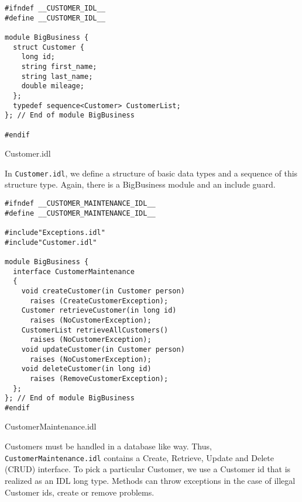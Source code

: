 \newpage
 
\begin{Example}
\begin{minifbox}
\begin{small}
\begin{verbatim}
#ifndef __CUSTOMER_IDL__
#define __CUSTOMER_IDL__

module BigBusiness {
  struct Customer {
    long id;
    string first_name;
    string last_name;
    double mileage;
  };
  typedef sequence<Customer> CustomerList;
}; // End of module BigBusiness

#endif
\end{verbatim}
\end{small}
\end{minifbox}
\caption{Customer.idl}
\label{example:Customer}
\end{Example}

In {\tt Customer.idl}, we define a structure of basic 
data types and a sequence of this structure type.
Again, there is a BigBusiness module and an include guard.

\begin{Example}
\begin{minifbox}
\begin{small}
\begin{verbatim}
#ifndef __CUSTOMER_MAINTENANCE_IDL__
#define __CUSTOMER_MAINTENANCE_IDL__

#include"Exceptions.idl"
#include"Customer.idl"

module BigBusiness {
  interface CustomerMaintenance
  {
    void createCustomer(in Customer person) 
      raises (CreateCustomerException);
    Customer retrieveCustomer(in long id)  
      raises (NoCustomerException);
    CustomerList retrieveAllCustomers()  
      raises (NoCustomerException);
    void updateCustomer(in Customer person)  
      raises (NoCustomerException);
    void deleteCustomer(in long id)  
      raises (RemoveCustomerException);
  };
}; // End of module BigBusiness
#endif
\end{verbatim}
\end{small}
\end{minifbox}
\caption{CustomerMaintenance.idl}
\label{example:}
\end{Example}
Customers must be handled in a database like way. Thus, {\tt CustomerMaintenance.idl} 
contains a Create, Retrieve, Update and Delete (CRUD) interface. 
To pick a particular Customer, we use a Customer id that is realized as an IDL long type.
Methods can throw exceptions in the case of illegal Customer ids, create or remove problems. 

